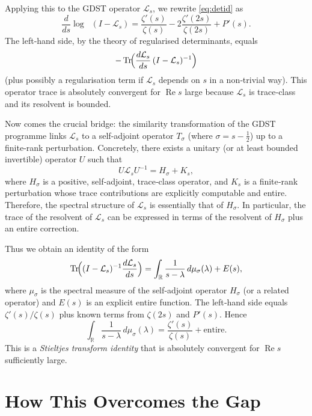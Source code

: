 \documentclass[11pt,a4paper]{article}
\newcommand{\R}{\mathbb{R}}
\newcommand{\LOp}{\mathcal{L}}
\newcommand{\TOp}{T}
\newcommand{\Tr}{\operatorname{Tr}}
\newcommand{\RE}{\operatorname{Re}}
\DeclareMathOperator{\detreg}{det_{(2)}}
\begin{document}
Applying this to the GDST operator \(\LOp_s\), we rewrite \eqref{eq:detid} as
\[
\frac{d}{ds} \log \detreg(I - \LOp_s) = \frac{\zeta'(s)}{\zeta(s)} - 2\frac{\zeta'(2s)}{\zeta(2s)} + P'(s).
\]
The left‑hand side, by the theory of regularised determinants, equals
\[
- \Tr\!\Bigl( \frac{d\LOp_s}{ds} \, (I - \LOp_s)^{-1} \Bigr)
\]
(plus possibly a regularisation term if \(\LOp_s\) depends on \(s\) in a non‑trivial way). This operator trace is absolutely convergent for \(\RE s\) large because \(\LOp_s\) is trace‑class and its resolvent is bounded.

Now comes the crucial bridge: the similarity transformation of the GDST programme links \(\LOp_s\) to a self‑adjoint operator \(\TOp_\sigma\) (where \(\sigma = s - \frac12\)) up to a finite‑rank perturbation. Concretely, there exists a unitary (or at least bounded invertible) operator \(U\) such that
\[
U \LOp_s U^{-1} = H_\sigma + K_s,
\]
where \(H_\sigma\) is a positive, self‑adjoint, trace‑class operator, and \(K_s\) is a finite‑rank perturbation whose trace contributions are explicitly computable and entire. Therefore, the spectral structure of \(\LOp_s\) is essentially that of \(H_\sigma\). In particular, the trace of the resolvent of \(\LOp_s\) can be expressed in terms of the resolvent of \(H_\sigma\) plus an entire correction.

Thus we obtain an identity of the form
\begin{equation}\label{eq:traceid}
\Tr\!\Bigl( (I - \LOp_s)^{-1} \frac{d\LOp_s}{ds} \Bigr)
= \int_{\R} \frac{1}{s - \lambda} \, d\mu_\sigma(\lambda) + E(s),
\end{equation}
where \(\mu_\sigma\) is the spectral measure of the self‑adjoint operator \(H_\sigma\) (or a related operator) and \(E(s)\) is an explicit entire function. The left‑hand side equals \(\zeta'(s)/\zeta(s)\) plus known terms from \(\zeta(2s)\) and \(P'(s)\). Hence
\[
\int_{\R} \frac{1}{s - \lambda} \, d\mu_\sigma(\lambda) = \frac{\zeta'(s)}{\zeta(s)} + \text{entire}.
\]
This is a \emph{Stieltjes transform identity} that is absolutely convergent for \(\RE s\) sufficiently large.

\section{How This Overcomes the Gap}
\end{document}
